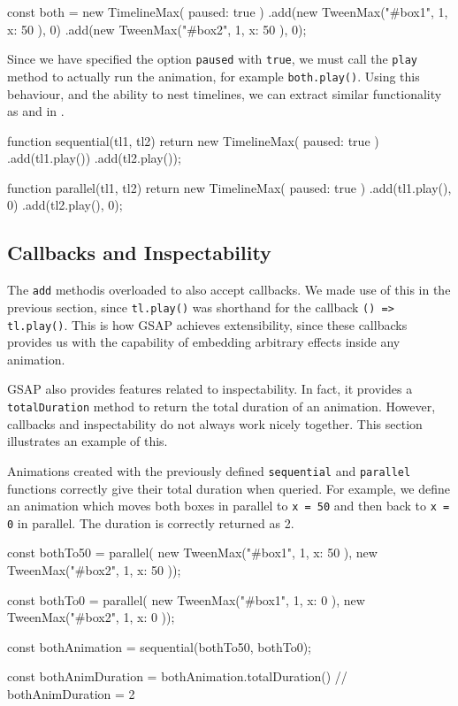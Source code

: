 \begin{js}
const both = new TimelineMax({ paused: true })
  .add(new TweenMax("#box1", 1, { x: 50 }), 0)
  .add(new TweenMax("#box2", 1, { x: 50 }), 0);
\end{js}

Since we have specified the option \texttt{paused} with \texttt{true}, we must call the \texttt{play} method to actually run the animation, for example \texttt{both.play()}. Using this behaviour, and the ability to nest timelines, we can extract similar functionality as  and  in \dsl{}.

\begin{js}
function sequential(tl1, tl2) {
  return new TimelineMax({ paused: true })
    .add(tl1.play())
    .add(tl2.play());
}

function parallel(tl1, tl2) {
  return new TimelineMax({ paused: true })
    .add(tl1.play(), 0)
    .add(tl2.play(), 0);
}
\end{js}

\subsection{Callbacks and Inspectability}

The \texttt{add} methodis overloaded to also accept callbacks. We made use of this in the previous section, since \texttt{tl.play()} was shorthand for the callback \texttt{() => tl.play()}. This is how GSAP achieves extensibility, since these callbacks provides us with the capability of embedding arbitrary effects inside any animation.

GSAP also provides features related to inspectability. In fact, it provides a \texttt{totalDuration} method to return the total duration of an animation. However, callbacks and inspectability do not always work nicely together. This section illustrates an example of this.

Animations created with the previously defined \texttt{sequential} and \texttt{parallel} functions correctly give their total duration when queried. For example, we define an animation which moves both boxes in parallel to \texttt{x = 50} and then back to \texttt{x = 0} in parallel. The duration is correctly returned as 2.

\begin{js}
const bothTo50 = parallel(
  new TweenMax("#box1", 1, { x: 50 }),
  new TweenMax("#box2", 1, { x: 50 }));

const bothTo0 = parallel(
  new TweenMax("#box1", 1, { x: 0 }),
  new TweenMax("#box2", 1, { x: 0 }));

const bothAnimation = sequential(bothTo50, bothTo0);

const bothAnimDuration = bothAnimation.totalDuration()
// bothAnimDuration = 2
\end{js}

